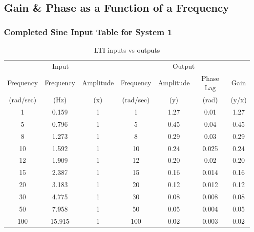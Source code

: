 \documentclass[12pt]{article}
\begin{document}
\subsection{Gain \& Phase as a Function of a Frequency}
\subsubsection{Completed Sine Input Table for System 1}
\begin{table}[h]
\centering
\begin{tabular}{ccccccc}
\multicolumn{3}{c}{Input}         & \multicolumn{4}{c}{Output}                \\
Frequency & Frequency & Amplitude & Frequency & Amplitude & Phase Lag & Gain  \\
(rad/sec) & (Hz)      & (x)       & (rad/sec) & (y)       & (rad)     & (y/x) \\
1         & 0.159     & 1         & 1         & 1.27      & 0.01      & 1.27  \\
5         & 0.796     & 1         & 5         & 0.45      & 0.04      & 0.45  \\
8         & 1.273     & 1         & 8         & 0.29      & 0.03      & 0.29  \\
10        & 1.592     & 1         & 10        & 0.24      & 0.025     & 0.24  \\
12        & 1.909     & 1         & 12        & 0.20      & 0.02      & 0.20  \\
15        & 2.387     & 1         & 15        & 0.16      & 0.014     & 0.16  \\
20        & 3.183     & 1         & 20        & 0.12      & 0.012     & 0.12  \\
30        & 4.775     & 1         & 30        & 0.08      & 0.008     & 0.08  \\
50        & 7.958     & 1         & 50        & 0.05      & 0.004     & 0.05  \\
100       & 15.915    & 1         & 100       & 0.02      & 0.003     & 0.02 
\end{tabular}
\caption{LTI inputs vs outputs}
\end{table}
\end{document}
